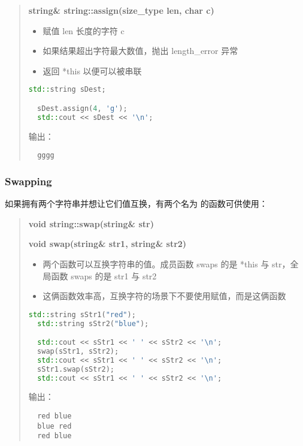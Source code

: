 \documentclass[../../LearnCpp.tex]{subfiles}
\begin{document}
\begin{quotation}
  \textbf{string\& string::assign(size\_type len, char c)}

  \begin{itemize}
    \item 赋值 len 长度的字符 c
    \item 如果结果超出字符最大数值，抛出 length\_error 异常
    \item 返回 *this 以便可以被串联
  \end{itemize}

  \begin{lstlisting}[language=C++]
  std::string sDest;

  sDest.assign(4, 'g');
  std::cout << sDest << '\n';
  \end{lstlisting}

  输出：

  \begin{lstlisting}
  gggg
  \end{lstlisting}
\end{quotation}

\subsubsection*{Swapping}

如果拥有两个字符串并想让它们值互换，有两个名为  的函数可供使用：

\begin{quotation}
  \textbf{void string::swap(string\& str)}

  \textbf{void swap(string\& str1, string\& str2)}

  \begin{itemize}
    \item 两个函数可以互换字符串的值。成员函数 swaps 的是 *this 与 str，全局函数 swaps 的是 str1 与 str2
    \item 这俩函数效率高，互换字符的场景下不要使用赋值，而是这俩函数
  \end{itemize}

  \begin{lstlisting}[language=C++]
  std::string sStr1("red");
  std::string sStr2("blue");

  std::cout << sStr1 << ' ' << sStr2 << '\n';
  swap(sStr1, sStr2);
  std::cout << sStr1 << ' ' << sStr2 << '\n';
  sStr1.swap(sStr2);
  std::cout << sStr1 << ' ' << sStr2 << '\n';
  \end{lstlisting}

  输出：

  \begin{lstlisting}
  red blue
  blue red
  red blue
  \end{lstlisting}
\end{quotation}
\end{document}
